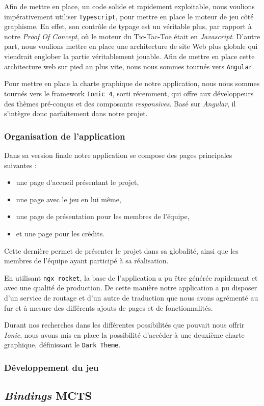 \documentclass[a4paper,11pt]{article}
\providecommand{\tightlist}{%
  \setlength{\itemsep}{0pt}\setlength{\parskip}{0pt}}
\begin{document}
Afin de mettre en place, un code solide et rapidement exploitable, nous
voulions impérativement utiliser \texttt{Typescript}, pour mettre en
place le moteur de jeu côté graphisme. En effet, son contrôle de typage
est un véritable plus, par rapport à notre \emph{Proof Of Concept}, où
le moteur du Tic-Tac-Toe était en \emph{Javascript}. D'autre part, nous
voulions mettre en place une architecture de site Web plus globale qui
viendrait englober la partie véritablement jouable. Afin de mettre en
place cette architecture web sur pied au plus vite, nous nous sommes
tournés vers \texttt{Angular}.

Pour mettre en place la charte graphique de notre application, nous nous
sommes tournés vers le framework \texttt{Ionic\ 4}, sorti récemment, qui
offre aux développeurs des thèmes pré-conçus et des composants
\emph{responsives}. Basé sur \emph{Angular}, il s'intègre donc
parfaitement dans notre projet.

\hypertarget{organisation-de-lapplication}{%
\subsubsection{Organisation de
l'application}\label{organisation-de-lapplication}}

Dans sa version finale notre application se compose des pages
principales suivantes :

\begin{itemize}
\tightlist
\item
  une page d'accueil présentant le projet,
\item
  une page avec le jeu en lui même,
\item
  une page de présentation pour les membres de l'équipe,
\item
  et une page pour les crédits.
\end{itemize}

Cette dernière permet de présenter le projet dans sa globalité, ainsi
que les membres de l'équipe ayant participé à sa réalisation.

En utilisant \texttt{ngx\ rocket}, la base de l'application a pu être
générée rapidement et avec une qualité de production. De cette manière
notre application a pu disposer d'un service de routage et d'un autre de
traduction que nous avons agrémenté au fur et à mesure des différents
ajouts de pages et de fonctionnalités.

Durant nos recherches dans les différentes possibilités que pouvait nous
offrir \emph{Ionic}, nous avons mis en place la possibilité d'accéder à
une deuxième charte graphique, définissant le \texttt{Dark\ Theme}.

\hypertarget{duxe9veloppement-du-jeu}{%
\subsubsection{Développement du jeu}\label{duxe9veloppement-du-jeu}}

\hypertarget{bindings-mcts}{%
\subsection{\texorpdfstring{\emph{Bindings}
MCTS}{Bindings MCTS}}\label{bindings-mcts}}

% 

\end{document}

